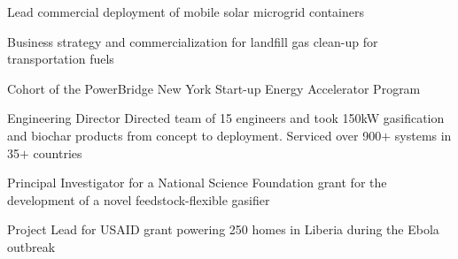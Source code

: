 \documentclass[]{deedy-resume-openfont}
\begin{document}
\begin{minipage}[t]{0.67\textwidth}
\begin{tightemize}
\item Lead commercial deployment of mobile solar microgrid containers
\end{tightemize}

\begin{tightemize}
\item Business strategy and commercialization for landfill gas clean-up for transportation fuels
\item Cohort of the PowerBridge New York Start-up Energy Accelerator Program
\end{tightemize}



\begin{tightemize}
\item Engineering Director Directed team of 15 engineers and took 150kW gasification and biochar products from concept to deployment. Serviced over 900$+$ systems in 35$+$ countries
\item Principal Investigator for a National Science Foundation grant for the development of a novel feedstock-flexible gasifier
\item Project Lead for USAID grant powering 250 homes in Liberia during the Ebola outbreak 
\end{tightemize}


\end{minipage}
\end{document}
